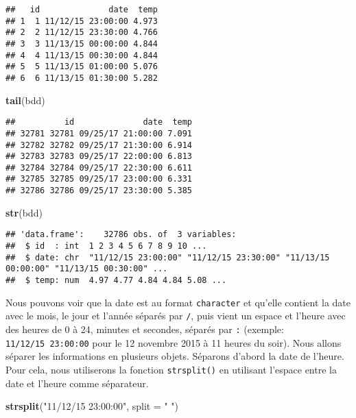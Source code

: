 \documentclass[]{book}
\newenvironment{Shaded}{\begin{snugshade}}{\end{snugshade}}
\newcommand{\KeywordTok}[1]{\textcolor[rgb]{0.13,0.29,0.53}{\textbf{#1}}}
\newcommand{\DataTypeTok}[1]{\textcolor[rgb]{0.13,0.29,0.53}{#1}}
\newcommand{\StringTok}[1]{\textcolor[rgb]{0.31,0.60,0.02}{#1}}
\newcommand{\NormalTok}[1]{#1}
\theoremstyle{definition}
\theoremstyle{definition}
\theoremstyle{definition}
\theoremstyle{remark}
\begin{document}
\begin{verbatim}
##   id              date  temp
## 1  1 11/12/15 23:00:00 4.973
## 2  2 11/12/15 23:30:00 4.766
## 3  3 11/13/15 00:00:00 4.844
## 4  4 11/13/15 00:30:00 4.844
## 5  5 11/13/15 01:00:00 5.076
## 6  6 11/13/15 01:30:00 5.282
\end{verbatim}

\begin{Shaded}
\begin{Highlighting}[]
\KeywordTok{tail}\NormalTok{(bdd)}
\end{Highlighting}
\end{Shaded}

\begin{verbatim}
##          id              date  temp
## 32781 32781 09/25/17 21:00:00 7.091
## 32782 32782 09/25/17 21:30:00 6.914
## 32783 32783 09/25/17 22:00:00 6.813
## 32784 32784 09/25/17 22:30:00 6.611
## 32785 32785 09/25/17 23:00:00 6.331
## 32786 32786 09/25/17 23:30:00 5.385
\end{verbatim}

\begin{Shaded}
\begin{Highlighting}[]
\KeywordTok{str}\NormalTok{(bdd)}
\end{Highlighting}
\end{Shaded}

\begin{verbatim}
## 'data.frame':    32786 obs. of  3 variables:
##  $ id  : int  1 2 3 4 5 6 7 8 9 10 ...
##  $ date: chr  "11/12/15 23:00:00" "11/12/15 23:30:00" "11/13/15 00:00:00" "11/13/15 00:30:00" ...
##  $ temp: num  4.97 4.77 4.84 4.84 5.08 ...
\end{verbatim}

Nous pouvons voir que la date est au format \texttt{character} et
qu'elle contient la date avec le mois, le jour et l'année séparés par
\texttt{/}, puis vient un espace et l'heure avec des heures de 0 à 24,
minutes et secondes, séparés par \texttt{:} (exemple:
\texttt{11/12/15\ 23:00:00} pour le 12 novembre 2015 à 11 heures du
soir). Nous allons séparer les informations en plusieurs objets.
Séparons d'abord la date de l'heure. Pour cela, nous utiliserons la
fonction \texttt{strsplit()} en utilisant l'espace entre la date et
l'heure comme séparateur.

\begin{Shaded}
\begin{Highlighting}[]
\KeywordTok{strsplit}\NormalTok{(}\StringTok{"11/12/15 23:00:00"}\NormalTok{, }\DataTypeTok{split =} \StringTok{" "}\NormalTok{)}
\end{Highlighting}
\end{Shaded}
\end{document}
